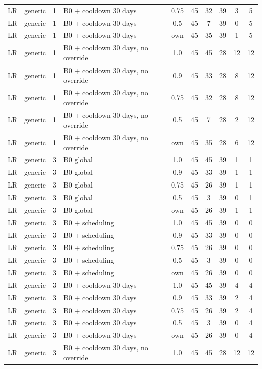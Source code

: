 \documentclass[10pt,onecolumn,letterpaper]{article}
\begin{document}
\begin{longtable}{lllp{4.4cm}cccccc}
LR & generic & 1 & B0 + cooldown 30 days & 0.75 & 45 & 32 & 39 & 3 & 5 \\
LR & generic & 1 & B0 + cooldown 30 days & 0.5 & 45 & 7 & 39 & 0 & 5 \\
LR & generic & 1 & B0 + cooldown 30 days & own & 45 & 35 & 39 & 1 & 5 \\
LR & generic & 1 & B0 + cooldown 30 days, no override & 1.0 & 45 & 45 & 28 & 12 & 12 \\
LR & generic & 1 & B0 + cooldown 30 days, no override & 0.9 & 45 & 33 & 28 & 8 & 12 \\
LR & generic & 1 & B0 + cooldown 30 days, no override & 0.75 & 45 & 32 & 28 & 8 & 12 \\
LR & generic & 1 & B0 + cooldown 30 days, no override & 0.5 & 45 & 7 & 28 & 2 & 12 \\
LR & generic & 1 & B0 + cooldown 30 days, no override & own & 45 & 35 & 28 & 6 & 12 \\
LR & generic & 3 & B0 global & 1.0 & 45 & 45 & 39 & 1 & 1 \\
LR & generic & 3 & B0 global & 0.9 & 45 & 33 & 39 & 1 & 1 \\
LR & generic & 3 & B0 global & 0.75 & 45 & 26 & 39 & 1 & 1 \\
LR & generic & 3 & B0 global & 0.5 & 45 & 3 & 39 & 0 & 1 \\
LR & generic & 3 & B0 global & own & 45 & 26 & 39 & 1 & 1 \\
LR & generic & 3 & B0 + scheduling & 1.0 & 45 & 45 & 39 & 0 & 0 \\
LR & generic & 3 & B0 + scheduling & 0.9 & 45 & 33 & 39 & 0 & 0 \\
LR & generic & 3 & B0 + scheduling & 0.75 & 45 & 26 & 39 & 0 & 0 \\
LR & generic & 3 & B0 + scheduling & 0.5 & 45 & 3 & 39 & 0 & 0 \\
LR & generic & 3 & B0 + scheduling & own & 45 & 26 & 39 & 0 & 0 \\
LR & generic & 3 & B0 + cooldown 30 days & 1.0 & 45 & 45 & 39 & 4 & 4 \\
LR & generic & 3 & B0 + cooldown 30 days & 0.9 & 45 & 33 & 39 & 2 & 4 \\
LR & generic & 3 & B0 + cooldown 30 days & 0.75 & 45 & 26 & 39 & 2 & 4 \\
LR & generic & 3 & B0 + cooldown 30 days & 0.5 & 45 & 3 & 39 & 0 & 4 \\
LR & generic & 3 & B0 + cooldown 30 days & own & 45 & 26 & 39 & 0 & 4 \\
LR & generic & 3 & B0 + cooldown 30 days, no override & 1.0 & 45 & 45 & 28 & 12 & 12 \\

\end{longtable}
\end{document}
